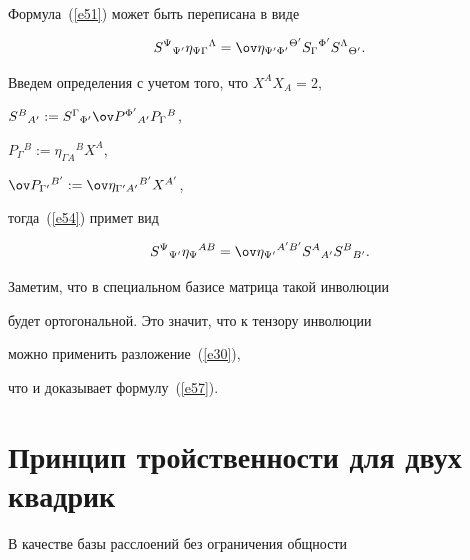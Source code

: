 \begin{pf}


Формула~(\ref{e51}) может быть переписана в виде


\begin{equation}


\label{e54}


S^\Psi{}_{\Psi '}\eta_{\Psi\Gamma}{}^\Lambda=


\ov \eta_{\Psi '\Phi '}{}^{\Theta '}S_\Gamma{}^{\Phi '}


S^\Lambda{}_{\Theta '}.


\end{equation}


Введем определения с учетом того, что $X^AX_A=2$,




$S^B{}_{A '}:=S^\Gamma{}_{\Phi '} \ov P^{\Phi '}{}_{A'}


P_\Gamma{}^B$,


$P_\Gamma{}^B:=\eta_{\Gamma A}{}^B X^A$,


$\ov P_{\Gamma '}{}^{B '}:=\ov \eta_{\Gamma' A'}{}^{B'} X^{A'}$,


тогда~(\ref{e54}) примет вид


\begin{equation}


\label{e57}


S^\Psi{}_{\Psi '}\eta_\Psi{}^{AB}=


\ov \eta_{\Psi '}{}^{A'B'}S^A{}_{A'}S^B{}_{B'}.


\end{equation}


Заметим, что в специальном базисе матрица такой инволюции


будет ортогональной. Это значит, что к тензору инволюции


можно применить разложение~(\ref{e30}),


что и доказывает формулу~(\ref{e57}).


\end{pf}





\section{Принцип тройственности для двух квадрик}





В качестве базы расслоений без ограничения общности


